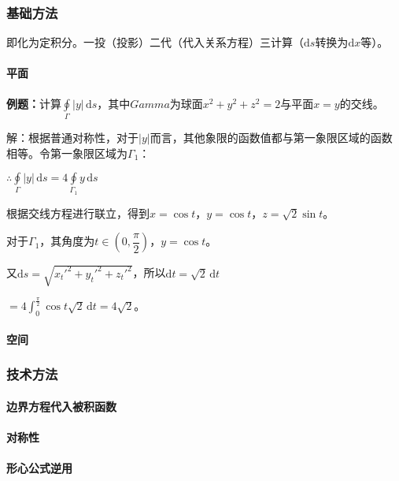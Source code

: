 \documentclass[UTF8, 12pt]{ctexart}
\begin{document}
\subsubsection{基础方法}

即化为定积分。一投（投影）二代（代入关系方程）三计算（$\textrm{d}s$转换为$\textrm{d}x$等）。

\paragraph{平面} \leavevmode \medskip

\textbf{例题：}计算$\oint\limits_\Gamma\vert y\vert\,\textrm{d}s$，其中$Gamma$为球面$x^2+y^2+z^2=2$与平面$x=y$的交线。

解：根据普通对称性，对于$\vert y\vert$而言，其他象限的函数值都与第一象限区域的函数相等。令第一象限区域为$\Gamma_1$：

$\therefore\oint\limits_\Gamma\vert y\vert\,\textrm{d}s=4\oint\limits_{\Gamma_1}y\,\textrm{d}s$

根据交线方程进行联立，得到$x=\cos t$，$y=\cos t$，$z=\sqrt{2}\sin t$。

对于$\Gamma_1$，其角度为$t\in\left(0,\dfrac{\pi}{2}\right)$，$y=\cos t$。

又$\textrm{d}s=\sqrt{x_t'^2+y_t'^2+z_t'^2}$，所以$\textrm{d}t=\sqrt{2}\,\textrm{d}t$

$=4\int_0^\frac{\pi}{2}\cos t\sqrt{2}\,\textrm{d}t=4\sqrt{2}$。

\paragraph{空间} \leavevmode \medskip

\subsubsection{技术方法}

\paragraph{边界方程代入被积函数} \leavevmode \medskip

\paragraph{对称性} \leavevmode \medskip

\paragraph{形心公式逆用} \leavevmode \medskip
\end{document}
